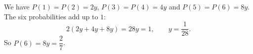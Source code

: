 We have $P(1)=P(2)=2y$, $P(3)=P(4)=4y$ and $P(5)=P(6)=8y$. The six probabilities add up to $1$:
\[2(2y+4y+8y)=28y=1,\qquad y=\dfrac1{28}.\]
So $P(6)=8y=\boxed{\dfrac27}$.
